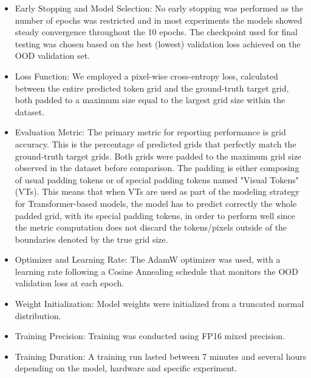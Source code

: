 \begin{itemize}
    \vspace{1em}
    \item Early Stopping and Model Selection: No early stopping was performed as the number of epochs was restricted and in most experiments the models showed steady convergence throughout the 10 epochs. The checkpoint used for final testing was chosen based on the best (lowest) validation loss achieved on the OOD validation set.

    \vspace{1em}
    \item Loss Function: We employed a pixel-wise cross-entropy loss, calculated between the entire predicted token grid and the ground-truth target grid, both padded to a maximum size equal to the largest grid size within the dataset.

    \vspace{1em}
    \item Evaluation Metric: The primary metric for reporting performance is grid accuracy. This is the percentage of predicted grids that perfectly match the ground-truth target grids. Both grids were padded to the maximum grid size observed in the dataset before comparison. The padding is either composing of usual padding tokens or of special padding tokens named "Visual Tokens" (VTs)\citep{arc_vit}. This means that when VTs are used as part of the modeling strategy for Transformer-based models, the model has to predict correctly the whole padded grid, with its special padding tokens, in order to perform well since the metric computation does not discard the tokens/pixels outside of the boundaries denoted by the true grid size.
    
    \vspace{1em}
    \item Optimizer and Learning Rate: The AdamW optimizer \citep{Loshchilov_AdamW_2019} was used, with a learning rate following a Cosine Annealing schedule that monitors the OOD validation loss at each epoch.

    \vspace{1em}
    \item Weight Initialization: Model weights were initialized from a truncated normal distribution.

    \vspace{1em}
    \item Training Precision: Training was conducted using FP16 mixed precision.
    
    \vspace{1em}
    \item Training Duration: A training run lasted between 7 minutes and several hours depending on the model, hardware and specific experiment.

\end{itemize}


